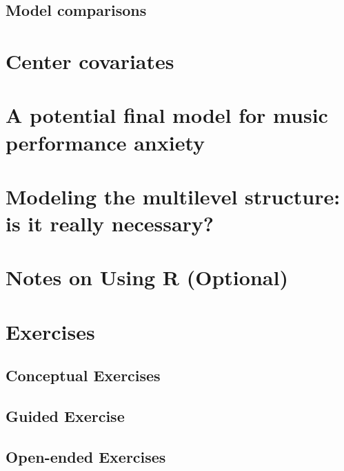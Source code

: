 \documentclass[
]{krantz}
\begin{document}
\hypertarget{compare:modeld}{%
\subsection{Model comparisons}\label{compare:modeld}}

\hypertarget{sec:modele}{%
\section{Center covariates}\label{sec:modele}}

\hypertarget{modelf}{%
\section{A potential final model for music performance anxiety}\label{modelf}}

\hypertarget{multinecessary}{%
\section{Modeling the multilevel structure: is it really necessary?}\label{multinecessary}}

\hypertarget{notesr8}{%
\section{Notes on Using R (Optional)}\label{notesr8}}

\hypertarget{exercises-7}{%
\section{Exercises}\label{exercises-7}}

\hypertarget{conceptual-exercises-5}{%
\subsection{Conceptual Exercises}\label{conceptual-exercises-5}}

\hypertarget{guided-exercise-1}{%
\subsection{Guided Exercise}\label{guided-exercise-1}}

\hypertarget{open-ended-exercises-3}{%
\subsection{Open-ended Exercises}\label{open-ended-exercises-3}}
\end{document}
